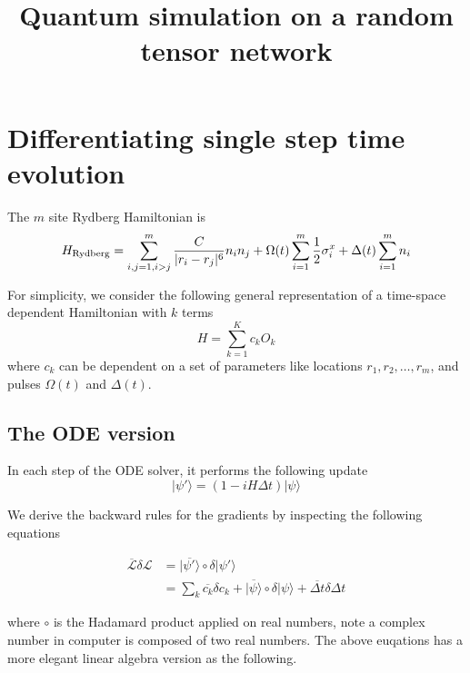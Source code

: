 \documentclass{article}
\title{Quantum simulation on a random tensor network}
\theoremstyle{definition}
\begin{document}
\maketitle

\section{Differentiating single step time evolution}
The $m$ site Rydberg Hamiltonian is
\begin{equation}
    H_{\rm Rydberg} = \sum_{i,j=1, i>j}^{m} \frac{C}{|r_i-r_j|^6}n_i n_j + \Omega(t)\sum_{i=1}^{m} \frac{1}{2}\sigma_i^x + \Delta(t)\sum_{i=1}^{m} n_i
\end{equation}

For simplicity, we consider the following general representation of a time-space dependent Hamiltonian with $k$ terms
\begin{equation}
    H = \sum_{k=1}^{K} c_k O_k
\end{equation}
where $c_k$ can be dependent on a set of parameters like locations $r_1, r_2, \ldots, r_m$, and pulses $\Omega(t)$ and $\Delta(t)$.

\subsection{The ODE version}
In each step of the ODE solver, it performs the following update
\begin{equation}
    |\psi'\rangle = (1 - iH \Delta t) |\psi\rangle
\end{equation}

We derive the backward rules for the gradients by inspecting the following equations

\begin{equation}\label{eq:ad0}
    \begin{split}
    \overline{\mathcal{L}}\delta \mathcal{L} &= \overline{|\psi'\rangle} \circ \delta |\psi'\rangle\\
    &= \sum_k \overline{c_k} \delta c_k + \overline{|\psi\rangle}\circ\delta|\psi\rangle + \overline{\Delta t}\delta \Delta t
    \end{split}
\end{equation}

where $\circ$ is the Hadamard product applied on real numbers,
note a complex number in computer is composed of two real numbers.
The above euqations has a more elegant linear algebra version as the following.
\end{document}
